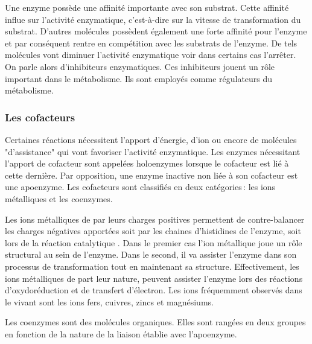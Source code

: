 \begin{refsegment}
    Une enzyme possède une affinité importante avec son substrat. Cette affinité influe sur l’activité enzymatique, c’est-à-dire sur la vitesse de transformation du substrat. D'autres molécules possèdent également une forte affinité pour l’enzyme et par conséquent rentre en compétition avec les substrats de l'enzyme. De tels molécules vont diminuer l’activité enzymatique voir dans certains cas l'arrêter. On parle alors d'inhibiteurs enzymatiques. Ces inhibiteurs jouent un rôle important dans le métabolisme. Ils sont employés comme régulateurs du métabolisme. 
    

    \subsubsection{Les cofacteurs}
    Certaines réactions nécessitent l’apport d'énergie, d’ion ou encore de molécules "d'assistance" qui vont favoriser l’activité enzymatique. Les enzymes nécessitant l'apport de cofacteur sont appelées holoenzymes lorsque le cofacteur est lié à cette dernière. Par opposition, une enzyme inactive non liée à son cofacteur est une apoenzyme. Les cofacteurs sont classifiés en deux catégories : les ions métalliques et les coenzymes.
    
    Les ions métalliques de par leurs charges positives permettent de contre-balancer les charges négatives apportées soit par les chaines d'histidines de l'enzyme, soit lors de la réaction catalytique \cite{christianson1991structural}. Dans le premier cas l'ion métallique joue un rôle structural au sein de l'enzyme. Dans le second, il va assister l'enzyme dans son processus de transformation tout en maintenant sa structure. Effectivement, les ions métalliques de part leur nature, peuvent assister l'enzyme lors des réactions d'oxydoréduction et de transfert d'électron. Les ions fréquemment observés dans le vivant sont les ions fers, cuivres, zincs et magnésiums.
    
    Les coenzymes sont des molécules organiques. Elles sont rangées en deux groupes en fonction de la nature de la liaison établie avec l'apoenzyme.
    

\end{refsegment}
